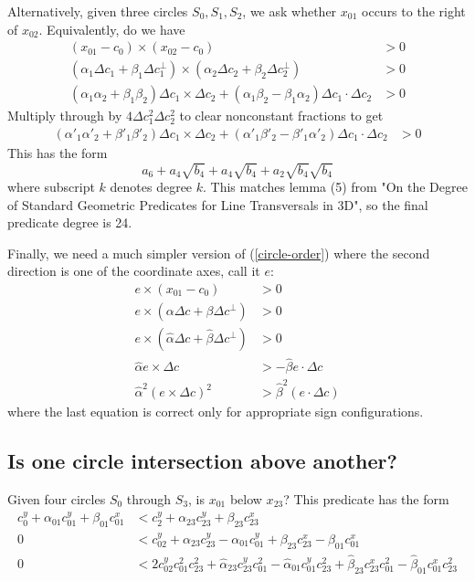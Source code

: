 \documentclass[11pt]{article}
\begin{document}
Alternatively, given three circles $S_0, S_1, S_2$, we ask whether $x_{01}$ occurs to the right of $x_{02}$.  Equivalently, do we have
\begin{align*}
(x_{01} - c_0) \times (x_{02} - c_0) &> 0 \\
(\alpha_1 \Delta c_1 + \beta_1 \Delta c_1^\perp) \times (\alpha_2 \Delta c_2 + \beta_2 \Delta c_2^\perp) &> 0 \\
(\alpha_1 \alpha_2 + \beta_1 \beta_2) \Delta c_1 \times \Delta c_2 + (\alpha_1 \beta_2 - \beta_1 \alpha_2) \Delta c_1 \cdot \Delta c_2 &> 0
\end{align*}
Multiply through by $4 \Delta c_1^2 \Delta c_2^2$ to clear nonconstant fractions to get
\begin{align} \label{circle-order}
(\alpha'_1 \alpha'_2 + \beta'_1 \beta'_2) \Delta c_1 \times \Delta c_2 + (\alpha'_1 \beta'_2 - \beta'_1 \alpha'_2) \Delta c_1 \cdot \Delta c_2 &> 0
\end{align}
This has the form
$$a_6 + a_4 \sqrt{b_4} + a_4 \sqrt{b_4} + a_2 \sqrt{b_4} \sqrt{b_4}$$
where subscript $k$ denotes degree $k$.  This matches lemma (5) from "On the Degree of Standard Geometric Predicates for Line Transversals in 3D", so the final predicate degree is 24.

Finally, we need a much simpler version of (\ref{circle-order}) where the second direction is one of the coordinate axes, call it $e$:
\begin{align*}
e \times (x_{01} - c_0) &> 0 \\
e \times (\alpha \Delta c + \beta \Delta c^\perp) &> 0 \\
e \times (\hat{\alpha} \Delta c + \hat{\beta} \Delta c^\perp) &> 0 \\
\hat{\alpha} e \times \Delta c &> -\hat{\beta} e \cdot \Delta c \\
\hat{\alpha}^2 (e \times \Delta c)^2 &> \hat{\beta}^2 (e \cdot \Delta c)
\end{align*}
where the last equation is correct only for appropriate sign configurations.

\subsection{Is one circle intersection above another?}

Given four circles $S_0$ through $S_3$, is $x_{01}$ below $x_{23}$?  This predicate has the form
\begin{align*}
c_0^y + \alpha_{01} c_{01}^y + \beta_{01} c_{01}^x &< c_2^y + \alpha_{23} c_{23}^y + \beta_{23} c_{23}^x \\
0 &< c_{02}^y + \alpha_{23} c_{23}^y - \alpha_{01} c_{01}^y + \beta_{23} c_{23}^x - \beta_{01} c_{01}^x \\
0 &< 2 c_{02}^y c_{01}^2 c_{23}^2 + \hat{\alpha}_{23} c_{23}^y c_{01}^2 - \hat{\alpha}_{01} c_{01}^y c_{23}^2 + \hat{\beta}_{23} c_{23}^x c_{01}^2 - \hat{\beta}_{01} c_{01}^x c_{23}^2
\end{align*}
\end{document}
